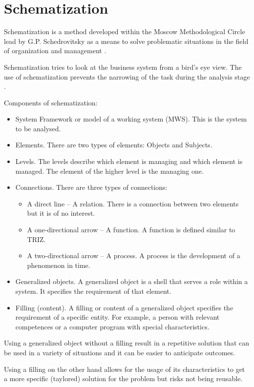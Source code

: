 \documentclass[a4paper,11pt]{article}
\begin{document}
\section{Schematization}

Schematization is a method developed within the Moscow Methodological Circle
lead by G.P. Schedrovitsky as a means to  solve problematic situations in the
field of organization and management \cite{K1}. 

Schematization tries to look at the business system from a bird’s eye view.
The use of schematization prevents the narrowing of the task during the
analysis stage \cite{K3}.

Components of schematization: \cite{K3}
\begin{itemize}
\item System Framework or model of a working system (MWS). This is the system
  to be analysed.
\item Elements. There are two types of elements: Objects and Subjects.
\item Levels. The levels describe which element is managing and which element
  is managed. The element of the higher level is the managing one.
\item Connections. There are three types of connections:
  \begin{itemize}
  \item A direct line – A relation. There is a connection between two elements
    but it is of no interest.
  \item A one-directional arrow – A function. A function is defined similar to
    TRIZ.
  \item A two-directional arrow – A process. A process is the development of a
    phenomenon in time.
  \end{itemize}
\item Generalized objects. A generalized object is a shell that serves a role
  within a system. It specifies the requirement of that element.
\item Filling (content). A filling or content of a generalized object
  specifies the requirement of a specific entity. For example, a person with
  relevant competences or a computer program with special characteristics.
\end{itemize}
Using a generalized object without a filling result in a repetitive solution
that can be used in a variety of situations and it can be easier to anticipate
outcomes.

Using a filling on the other hand allows for the usage of its characteristics
to get a more specific (taylored) solution for the problem but risks not being
reusable.
\end{document}
